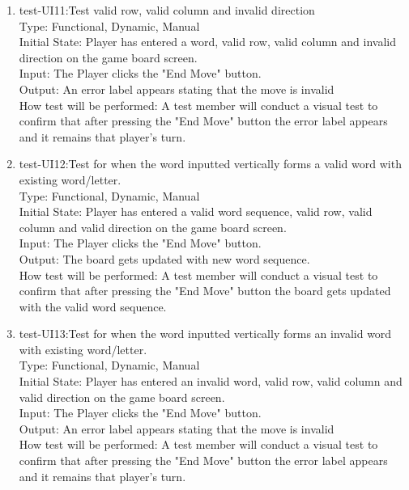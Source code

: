 \documentclass[12pt, titlepage]{article}
\begin{document}
\begin{enumerate}
    \item{test-UI11:Test valid row, valid column and invalid direction\\} %
    Type: Functional, Dynamic, Manual\\
    Initial State: Player has entered a word, valid row, valid column and invalid direction on the game board screen.\\
    Input: The Player clicks the "End Move" button.\\
    Output: An error label appears stating that the move is invalid \\
    How test will be performed: A test member will conduct a visual test to confirm that after pressing the "End Move" button the error label appears and it remains that player's turn.\\
    
    \item{test-UI12:Test for when the word inputted vertically forms a valid word with existing word/letter.\\} %
    Type: Functional, Dynamic, Manual\\
    Initial State: Player has entered a valid word sequence, valid row, valid column and valid direction on the game board screen.\\
    Input: The Player clicks the "End Move" button.\\
    Output: The board gets updated with new word sequence. \\
    How test will be performed: A test member will conduct a visual test to confirm that after pressing the "End Move" button the board gets updated with the valid word sequence.\\
    
    \item{test-UI13:Test for when the word inputted vertically forms an invalid word with existing word/letter.\\} %
    Type: Functional, Dynamic, Manual\\
    Initial State: Player has entered an invalid word, valid row, valid column and valid direction on the game board screen.\\
    Input: The Player clicks the "End Move" button.\\
    Output: An error label appears stating that the move is invalid \\
    How test will be performed: A test member will conduct a visual test to confirm that after pressing the "End Move" button the error label appears and it remains that player's turn.\\
    

\end{enumerate}
\end{document}
